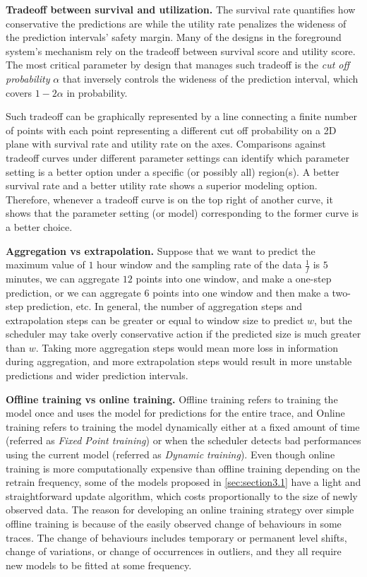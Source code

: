 \documentclass[sigplan,10pt,review,anonymous]{acmart}
\begin{document}
\textbf{Tradeoff between survival and utilization.} The survival rate quantifies
how conservative the predictions are while the utility rate penalizes the
wideness of the prediction intervals' safety margin. Many of the designs in the
foreground system's mechanism rely on the tradeoff between survival score and
utility score. The most critical parameter by design that manages such
tradeoff is the \textit{cut off probability} $\alpha$ that inversely controls
the wideness of the prediction interval, which covers $1 - 2\alpha$ in
probability. 

Such tradeoff can be graphically represented by a line connecting a finite
number of points with each point representing a different cut off probability on
a 2D plane with survival rate and utility rate on the axes. Comparisons
against tradeoff curves under different parameter settings can identify which
parameter setting is a better option under a specific (or possibly all)
region(s). A better survival rate and a better utility rate shows a superior
modeling option. Therefore, whenever a tradeoff curve is on the top right of
another curve, it shows that the parameter setting (or model) corresponding to
the former curve is a better choice. 

\textbf{Aggregation vs extrapolation.} Suppose that we want to predict the
maximum value of $1$ hour window and the sampling rate of the data $\frac{1}{f}$
is $5$ minutes, we can aggregate $12$ points into one window, and make a
one-step prediction, or we can aggregate $6$ points into one window and then
make a two-step prediction, etc. In general, the number of aggregation steps and
extrapolation steps can be greater or equal to window size to predict $w$, but
the scheduler may take overly conservative action if the predicted size is much
greater than $w$. Taking more aggregation steps would mean more loss in
information during aggregation, and more extrapolation steps would result in
more unstable predictions and wider prediction intervals.

\textbf{Offline training vs online training.} Offline training refers to
training the model once and uses the model for predictions for the entire trace,
and Online training refers to training the model dynamically either at a fixed
amount of time (referred as \textit{Fixed Point training}) or when the scheduler
detects bad performances using the current model (referred as \textit{Dynamic
training}). Even though online training is more computationally expensive than
offline training depending on the retrain frequency, some of the models proposed
in \cref{sec:section3.1}  have a light and straightforward update algorithm,
which costs proportionally to the size of newly observed data. The reason for
developing an online training strategy over simple offline training is because
of the easily observed change of behaviours in some traces. The change of
behaviours includes temporary or permanent level shifts, change of variations,
or change of occurrences in outliers, and they all require new models to be
fitted at some frequency.
\end{document}

